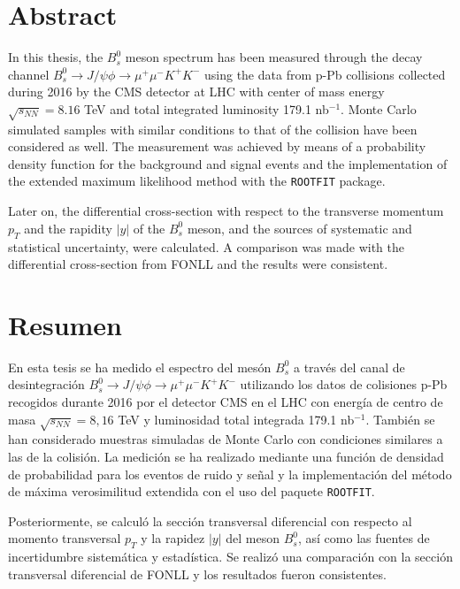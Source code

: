 \chapter*{Abstract}
\label{chap:Abstract}
In this thesis, the $B^0_s$ meson spectrum has been measured through the decay channel $B^0_s \to J/\psi \phi \to \mu^{+}\mu^{-} K^{+}K^{-}$ using the data from p-Pb collisions collected during 2016 by the CMS detector at LHC with center of mass energy $\sqrt{s_{NN}} = 8.16$ TeV and total integrated luminosity 179.1 nb$^{-1}$. Monte Carlo simulated samples with similar conditions to that of the collision have been considered as well. The measurement was achieved by means of a probability density function for the background and signal events and the implementation of the extended maximum likelihood method with the \verb|ROOTFIT| package. 

Later on, the differential cross-section with respect to the transverse momentum $p_T$ and the rapidity $|y|$ of the $B_s^0$ meson, and the sources of systematic and statistical uncertainty, were calculated. A comparison was made with the differential cross-section from FONLL and the results were consistent. 
\cleardoublepage

\chapter*{Resumen}
\label{chap:Resumen}
En esta tesis se ha medido el espectro del mesón $B^0_s$ a través del canal de desintegración $B^0_s \to J/\psi \phi \to \mu^{+}\mu^{-} K^{+}K^{-}$ utilizando los datos de colisiones p-Pb recogidos durante 2016 por el detector CMS en el LHC con energía de centro de masa $\sqrt{s_{NN}} = 8,16$ TeV y luminosidad total integrada 179.1 nb$^{-1}$. También se han considerado muestras simuladas de Monte Carlo con condiciones similares a las de la colisión. La medición se ha realizado mediante una función de densidad de probabilidad para los eventos de ruido y señal y la implementación del método de máxima verosimilitud extendida con el uso del paquete \verb|ROOTFIT|. 

Posteriormente, se calculó la sección transversal diferencial con respecto al momento transversal $p_T$ y la rapidez $|y|$ del meson $B^0_s$, así como las fuentes de incertidumbre sistemática y estadística. Se realizó una comparación con la sección transversal diferencial de FONLL y los resultados fueron consistentes. 

